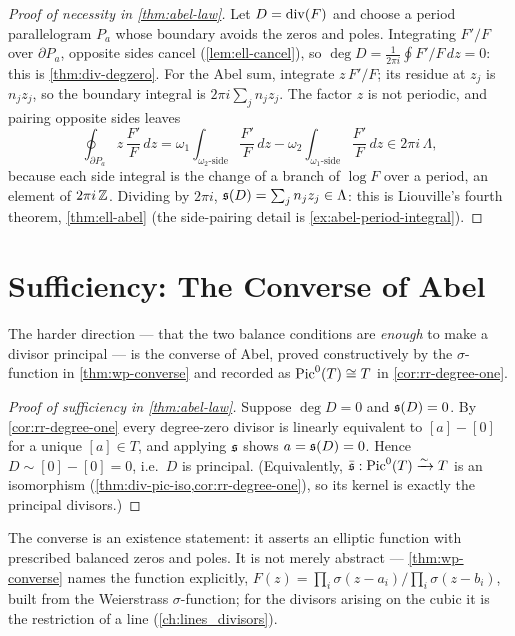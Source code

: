 \begin{proof}[Proof of necessity in \cref{thm:abel-law}]
Let \(D = \operatorname{div}(F)\) and choose a period parallelogram \(P_a\) whose boundary
avoids the zeros and poles. Integrating \(F'/F\) over \(\partial P_a\), opposite
sides cancel (\cref{lem:ell-cancel}), so \(\deg D = \frac{1}{2\pi i}\oint F'/F\,dz
= 0\): this is \cref{thm:div-degzero}. For the Abel sum, integrate \(z\,F'/F\); its
residue at \(z_j\) is \(n_j z_j\), so the boundary integral is
\(2\pi i\sum_j n_j z_j\). The factor \(z\) is not periodic, and pairing opposite
sides leaves
\[
  \oint_{\partial P_a} z\,\frac{F'}{F}\,dz
  = \omega_1\!\!\int_{\omega_2\text{-side}}\!\!\frac{F'}{F}\,dz
  - \omega_2\!\!\int_{\omega_1\text{-side}}\!\!\frac{F'}{F}\,dz
  \in 2\pi i\,\Lambda,
\]
because each side integral is the change of a branch of \(\log F\) over a period,
an element of \(2\pi i\,\mathbb{Z}\). Dividing by \(2\pi i\),
\(\mathfrak{s}(D) = \sum_j n_j z_j \in \Lambda\): this is Liouville's fourth theorem,
\cref{thm:ell-abel} (the side-pairing detail is \cref{ex:abel-period-integral}).
\end{proof}

\section{Sufficiency: The Converse of Abel}
\label{sec:abel-sufficiency}

The harder direction --- that the two balance conditions are \emph{enough} to make
a divisor principal --- is the converse of Abel, proved constructively by the
\(\sigma\)-function in \cref{thm:wp-converse} and recorded as \(\operatorname{Pic}^0(T)\cong T\)
in \cref{cor:rr-degree-one}.

\begin{proof}[Proof of sufficiency in \cref{thm:abel-law}]
Suppose \(\deg D = 0\) and \(\mathfrak{s}(D) = 0\). By \cref{cor:rr-degree-one} every
degree-zero divisor is linearly equivalent to \([a] - [0]\) for a unique
\([a] \in T\), and applying \(\mathfrak{s}\) shows \(a = \mathfrak{s}(D) = 0\). Hence
\(D \sim [0] - [0] = 0\), i.e.\ \(D\) is principal. (Equivalently,
\(\bar{\mathfrak{s}} : \operatorname{Pic}^0(T) \xrightarrow{\sim} T\) is an isomorphism
(\cref{thm:div-pic-iso,cor:rr-degree-one}), so its kernel is exactly the principal
divisors.)
\end{proof}

\begin{remark}
\label{rem:abel-constructive}
The converse is an existence statement: it asserts an elliptic function with
prescribed balanced zeros and poles. It is not merely abstract --- \cref{thm:wp-converse}
names the function explicitly, \(F(z) = \prod_i \sigma(z-a_i)/\prod_i \sigma(z-b_i)\),
built from the Weierstrass \(\sigma\)-function; for the divisors arising on the
cubic it is the restriction of a line (\cref{ch:lines_divisors}).
\end{remark}

